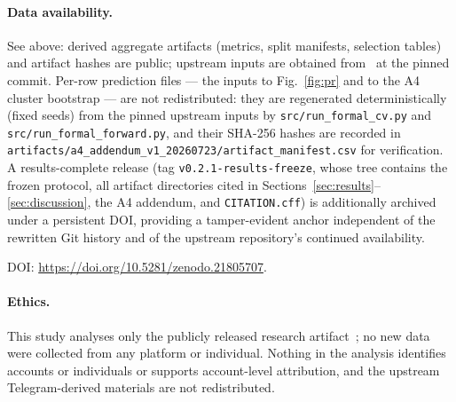 \documentclass[runningheads]{llncs}
\newif\ifanonymous
\begin{document}
\paragraph{Data availability.} See above: derived aggregate artifacts
(metrics, split manifests, selection tables) and artifact hashes are
public; upstream inputs are obtained from~\cite{UpstreamRepo} at the
pinned commit. Per-row prediction files --- the inputs to
Fig.~\ref{fig:pr} and to the A4 cluster bootstrap --- are not
redistributed: they are regenerated deterministically (fixed seeds)
from the pinned upstream inputs by \texttt{src/run\_formal\_cv.py} and
\texttt{src/run\_formal\_forward.py}, and their SHA-256 hashes are
recorded in
\texttt{artifacts/a4\_addendum\_v1\_20260723/artifact\_manifest.csv}
for verification. A results-complete release (tag
\texttt{v0.2.1-results-freeze}, whose tree contains the frozen
protocol, all artifact directories cited in
Sections~\ref{sec:results}--\ref{sec:discussion}, the A4 addendum, and
\texttt{CITATION.cff}) is additionally archived under a persistent DOI,
providing a tamper-evident anchor independent of the
rewritten Git history and of the upstream repository's continued
availability.
\ifanonymous
[{\itshape Archive DOI withheld for anonymous review.}]
\else
DOI: \url{https://doi.org/10.5281/zenodo.21805707}.
\fi

\paragraph{Ethics.} This study analyses only the publicly released
research artifact~\cite{UpstreamRepo}; no new data were collected from
any platform or individual. Nothing in the analysis identifies accounts
or individuals or supports account-level attribution, and the upstream
Telegram-derived materials are not redistributed.
\end{document}

